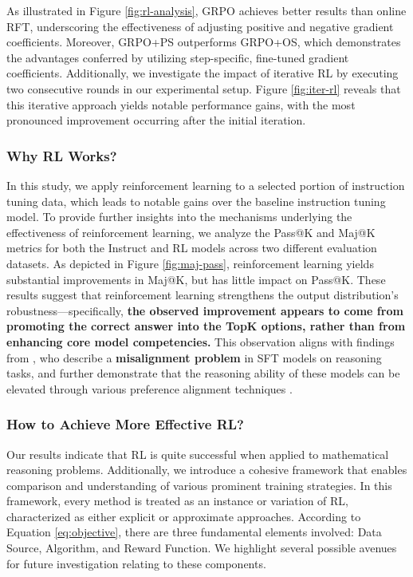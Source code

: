 \begin{itemize}[topsep=0pt]
\begin{itemize}[topsep=0pt]
As illustrated in Figure \ref{fig:rl-analysis}, GRPO achieves better results than online RFT, underscoring the effectiveness of adjusting positive and negative gradient coefficients. Moreover, GRPO+PS outperforms GRPO+OS, which demonstrates the advantages conferred by utilizing step-specific, fine-tuned gradient coefficients. Additionally, we investigate the impact of iterative RL by executing two consecutive rounds in our experimental setup. Figure \ref{fig:iter-rl} reveals that this iterative approach yields notable performance gains, with the most pronounced improvement occurring after the initial iteration.

\subsubsection{Why RL Works?} In this study, we apply reinforcement learning to a selected portion of instruction tuning data, which leads to notable gains over the baseline instruction tuning model. To provide further insights into the mechanisms underlying the effectiveness of reinforcement learning, we analyze the Pass@K and Maj@K metrics for both the Instruct and RL models across two different evaluation datasets. As depicted in Figure \ref{fig:maj-pass}, reinforcement learning yields substantial improvements in Maj@K, but has little impact on Pass@K. These results suggest that reinforcement learning strengthens the output distribution’s robustness—specifically, \textbf{the observed improvement appears to come from promoting the correct answer into the TopK options, rather than from enhancing core model competencies.} This observation aligns with findings from \citep{wang2023making}, who describe a \textbf{misalignment problem} in SFT models on reasoning tasks, and further demonstrate that the reasoning ability of these models can be elevated through various preference alignment techniques \citep{yuan2023rrhf,song2023preference,wang2023making}.

\subsubsection{How to Achieve More Effective RL?}
\label{sec:effec_rl}
Our results indicate that RL is quite successful when applied to mathematical reasoning problems. Additionally, we introduce a cohesive framework that enables comparison and understanding of various prominent training strategies. In this framework, every method is treated as an instance or variation of RL, characterized as either explicit or approximate approaches. According to Equation \ref{eq:objective}, there are three fundamental elements involved: Data Source, Algorithm, and Reward Function. We highlight several possible avenues for future investigation relating to these components.


\end{itemize}
\end{itemize}

